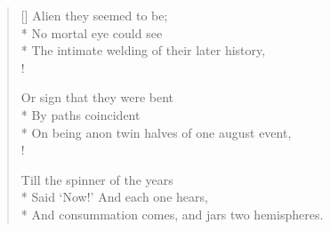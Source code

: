\documentclass[MAIN]{subfiles}
\begin{document}
\begin{verse}[\versewidth]
\vin \vin Alien they seemed to be;\\*
\vin \vin No mortal eye could see\\*
The intimate welding of their later history,\\!

\vin \vin Or sign that they were bent\\*
\vin \vin By paths coincident\\*
On being anon twin halves of one august event,\\!

\vin \vin Till the spinner of the years\\*
\vin \vin Said `Now!' And each one hears,\\*
And consummation comes, and jars two hemispheres.
\end{verse}
\end{document}
